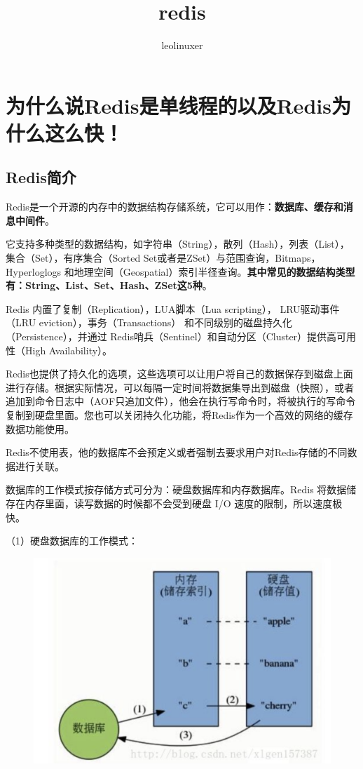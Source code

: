 \documentclass[12pt]{article}
\title{redis}
\author{leolinuxer}
\begin{document}
\maketitle
\tableofcontents

\section{为什么说Redis是单线程的以及Redis为什么这么快！
\cite{Why_Redis_Is_Single_Threaded_And_Fast}}

\subsection{Redis简介}
Redis是一个开源的内存中的数据结构存储系统，它可以用作：\textbf{数据库、缓存和消息中间件}。

它支持多种类型的数据结构，如字符串（String），散列（Hash），列表（List），集合（Set），有序集合（Sorted Set或者是ZSet）与范围查询，Bitmaps，Hyperloglogs 和地理空间（Geospatial）索引半径查询。\textbf{其中常见的数据结构类型有：String、List、Set、Hash、ZSet这5种}。

Redis 内置了复制（Replication），LUA脚本（Lua scripting）， LRU驱动事件（LRU eviction），事务（Transactions） 和不同级别的磁盘持久化（Persistence），并通过 Redis哨兵（Sentinel）和自动分区（Cluster）提供高可用性（High Availability）。

Redis也提供了持久化的选项，这些选项可以让用户将自己的数据保存到磁盘上面进行存储。根据实际情况，可以每隔一定时间将数据集导出到磁盘（快照），或者追加到命令日志中（AOF只追加文件），他会在执行写命令时，将被执行的写命令复制到硬盘里面。您也可以关闭持久化功能，将Redis作为一个高效的网络的缓存数据功能使用。

Redis不使用表，他的数据库不会预定义或者强制去要求用户对Redis存储的不同数据进行关联。

数据库的工作模式按存储方式可分为：硬盘数据库和内存数据库。Redis 将数据储存在内存里面，读写数据的时候都不会受到硬盘 I/O 速度的限制，所以速度极快。

（1）硬盘数据库的工作模式：
\begin{figure}[H]
    \centering
    \includegraphics[width=.5\textwidth]{fig/Redis_Fast_1.png}
\end{figure}
\end{document}
